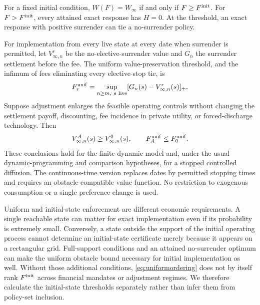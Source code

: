 \begin{theorem}
\label{thm:enforcementfrontier}
For a fixed initial condition, $W(F)=W_\infty$ if and only if $F\geq F^{\rm init}$. For $F>F^{\rm init}$, every attained exact response has $H=0$. At the threshold, an exact response with positive surrender can tie a no-surrender policy.

For implementation from every live state at every date when surrender is permitted, let $V^r_{\infty,n}$ be the no-elective-surrender value and $G_n$ the surrender settlement before the fee. The uniform value-preservation threshold, and the infimum of fees eliminating every elective-stop tie, is
\begin{equation}
 F^{\rm unif}_r=\sup_{n\geq m,\ s\ {\rm live}}
                    [G_n(s)-V^r_{\infty,n}(s)]_+.
 \label{eq:uniformthreshold}
\end{equation}
Suppose adjustment enlarges the feasible operating controls without changing the settlement payoff, discounting, fee incidence in private utility, or forced-discharge technology. Then
\begin{equation}
 V^A_{\infty,n}(s)\geq V^0_{\infty,n}(s),\qquad
 F^{\rm unif}_A\leq F^{\rm unif}_0.
 \label{eq:uniformordering}
\end{equation}
These conclusions hold for the finite dynamic model and, under the usual dynamic-programming and comparison hypotheses, for a stopped controlled diffusion. The continuous-time version replaces dates by permitted stopping times and requires an obstacle-compatible value function. No restriction to exogenous consumption or a single preference change is used.
\end{theorem}

Uniform and initial-state enforcement are different economic requirements. A single reachable state can matter for exact implementation even if its probability is extremely small. Conversely, a state outside the support of the initial operating process cannot determine an initial-state certificate merely because it appears on a rectangular grid. Full-support conditions and an attained no-surrender optimum can make the uniform obstacle bound necessary for initial implementation as well. Without those additional conditions, \eqref{eq:uniformordering} does not by itself rank $F^{\rm init}$ across financial mandates or adjustment regimes. We therefore calculate the initial-state thresholds separately rather than infer them from policy-set inclusion.

